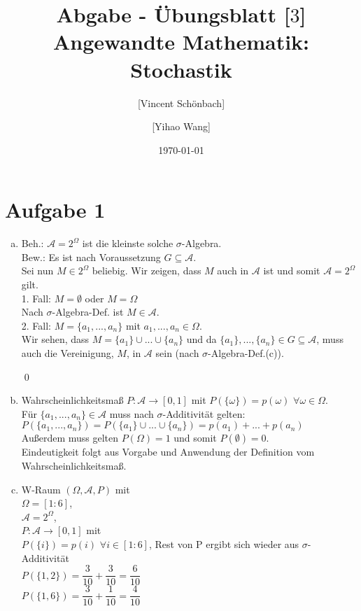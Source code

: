 \documentclass[10pt,a4paper]{article}
\begin{document}
\title{Abgabe - Übungsblatt [$3$]\\
\small{Angewandte Mathematik: Stochastik}}
\author{ [Vincent Schönbach] \and [Yihao Wang]}
\date{\today}
\maketitle

\section*{Aufgabe 1}
\begin{enumerate}[a)]
 \item Beh.: $\mathcal{A} = 2^\Omega$ ist die kleinste solche $\sigma$-Algebra.\\[1ex]
 Bew.: Es ist nach Voraussetzung $G \subseteq \mathcal{A}$. \\
 Sei nun $M \in 2^\Omega$ beliebig. Wir zeigen, dass $M$ auch in $\mathcal{A}$ ist und somit $\mathcal{A} = 2^\Omega$ gilt.\\
 1. Fall: $M = \emptyset$ oder $M = \Omega$ \\
   Nach $\sigma$-Algebra-Def. ist $M \in \mathcal{A}$. \\
 2. Fall: $M = \{a_1,...,a_n\}$ mit $a_1,...,a_n \in \Omega$. \\
 Wir sehen, dass $M= \{a_1\} \cup ... \cup \{a_n\}$ und da $\{a_1\}, ..., \{a_n\} \in G\subseteq \mathcal{A}$,
 muss auch die Vereinigung, $M$, in $\mathcal{A}$ sein (nach $\sigma$-Algebra-Def.(c)).
 
  \qed
  
 \item
 Wahrscheinlichkeitsmaß $P : \mathcal{A} \rightarrow [0,1]$ mit $P(\{\omega\})=p(\omega)$ $\forall \omega\in\Omega.$ \\
 Für $\{a_1,...,a_n\}\in\mathcal{A}$ muss nach $\sigma$-Additivität gelten: \\
 $P(\{a_1,...,a_n\})=P(\{a_1\} \cup ... \cup \{a_n\}) = p(a_1) + ... + p(a_n)$\\
 Außerdem muss gelten $P(\Omega) = 1$ und somit $P(\emptyset) = 0$.\\
 Eindeutigkeit folgt aus Vorgabe und Anwendung der Definition vom Wahrscheinlichkeitsmaß.
 
 \item W-Raum $(\Omega, \mathcal{A}, P)$ mit \\
 $\Omega = [1:6]$,\\
 $\mathcal{A} = 2^\Omega$,\\
 $P:\mathcal{A}\rightarrow [0,1]$ mit \\
 $P(\{i\})=p(i)$ $\forall i\in[1:6]$, Rest von P ergibt sich wieder aus $\sigma$-Additivität\\
 $P(\{1,2\}) = \dfrac{3}{10} + \dfrac{3}{10} = \dfrac{6}{10}$ \\
 $P(\{1,6\}) = \dfrac{3}{10} + \dfrac{1}{10} = \dfrac{4}{10}$ \\
 
\end{enumerate}
\end{document}
